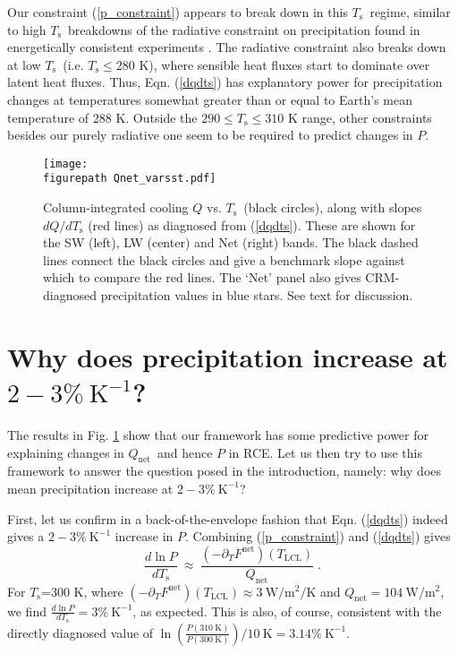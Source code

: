 \documentclass[9pt,twocolumn,twoside,lineno]{pnas-new}
\newcommand{\beqn}{\begin{equation}}
\newcommand{\eeqn}{\end{equation}}
\newcommand{\eqnref}[1]{(\ref{#1})}
\newcommand{\ppt}{\ensuremath{\partial_T}}
\newcommand{\Qnet}{\ensuremath{Q_\mathrm{net}}}
\newcommand{\Fnet}{\ensuremath{F^\mathrm{net}}}
\newcommand{\Wmsq}{\ensuremath{\mathrm{W/m^2}}}
\newcommand{\Kinverse}{\ensuremath{\mathrm{K^{-1}}}}
\newcommand{\Kelvin}{\ensuremath{\mathrm{K}}}
\newcommand{\Ts}{\ensuremath{T_\mathrm{s}}}
\newcommand{\Tlcl}{\ensuremath{T_\mathrm{LCL}}}
\newcommand{\figurepath}{./}
\begin{document}
Our constraint \eqnref{p_constraint} appears to break down in this  \Ts\ regime, similar to high \Ts\ breakdowns of the radiative constraint on precipitation found in energetically consistent experiments \cite{lehir2009, pierrehumbert2002}.  The radiative  constraint  also breaks down at low \Ts\ (i.e. $\Ts \leq 280$ K), where sensible heat fluxes start to dominate over latent heat fluxes. Thus, Eqn. \eqnref{dqdts} has explanatory power for  precipitation changes at  temperatures somewhat greater than or equal to Earth's mean temperature of 288 K. Outside the $290\leq \Ts \leq 310$ K range, other constraints besides our purely radiative one seem to be required to predict changes in $P$.

\begin{figure}[t]
	\begin{center}
			\texttt{[image: \\figurepath Qnet\_varsst.pdf]}
		\caption{Column-integrated cooling $Q$ vs. \Ts\ (black circles), along with slopes $d Q/d \Ts$ (red lines) as diagnosed from \eqnref{dqdts}. These are shown for the SW (left), LW (center) and Net (right) bands.  The black dashed lines connect the black circles and give a benchmark slope against which to compare the red lines. The `Net' panel also gives CRM-diagnosed precipitation values in blue stars. See text for discussion.
		\label{Qnet_varsst}
		}
	\end{center}
\end{figure}



\section{Why does precipitation increase at $2 -3\%\ \Kinverse$?} \label{sec_1percent}
The results in Fig. \ref{Qnet_varsst} show that our framework  has some predictive power for explaining changes in \Qnet\ and hence $P$ in RCE. Let us then try to use this framework to answer the question posed in the introduction, namely: why does mean precipitation increase at $2 -3\%\ \Kinverse$?

First, let us confirm in a back-of-the-envelope fashion that Eqn. \eqnref{dqdts} indeed gives a $2 -3\%\ \Kinverse$ increase in $P$. Combining \eqnref{p_constraint} and \eqnref{dqdts} gives
	\beqn
		\frac{d \ln  P}{d \Ts} \ \approx\  \frac{(-\ppt \Fnet)(\Tlcl)}{\Qnet} \; .
	\label{precip_estimate}
	\eeqn
For \Ts=300 K, where $(-\ppt \Fnet)(\Tlcl) \approx 3 \ \Wmsq/\mathrm{K}$ and $\Qnet =  104\ \Wmsq$, we find $\frac{d \ln  P}{d \Ts}=  3\%\ \Kinverse$, as expected.  This is also, of course, consistent with the directly diagnosed value of $\ln\left(\frac{P(310\ \Kelvin)}{P(300\ \Kelvin)}\right)/10\ \Kelvin = 3.14 \%\  \Kinverse$.
\end{document}
